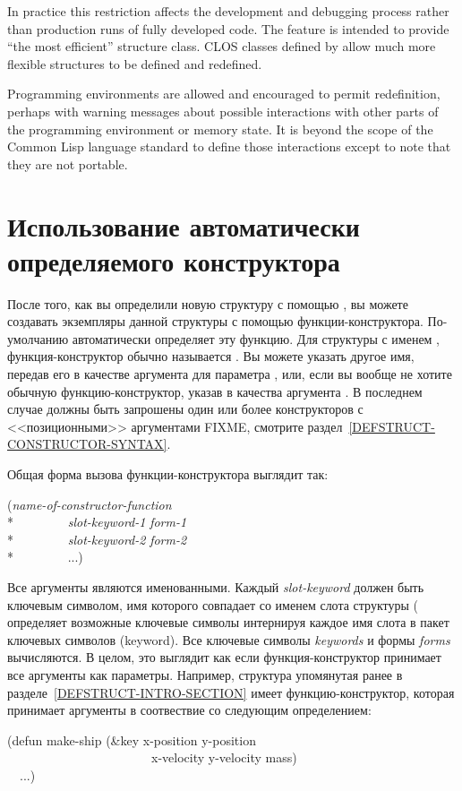 \begin{defmac}
\begin{newer}
In practice this restriction affects the development
and debugging process rather than production runs of fully developed code.
The  feature is intended to provide
``the most efficient'' structure class.
CLOS classes defined by 
allow much more flexible structures to be defined and redefined.

Programming environments are allowed and encouraged to permit 
redefinition, perhaps with warning messages about possible interactions
with other parts of the programming environment or memory state.
It is beyond the scope of the Common Lisp
language standard to define those interactions except to note that they
are not portable.
\end{newer}
\end{defmac}

\section{Использование автоматически определяемого конструктора}

После того, как вы определили новую структуру с помощью , вы
можете создавать экземпляры данной структуры с помощью функции-конструктора.
По-умолчанию  автоматически определяет эту функцию.
Для структуры с именем , функция-конструктор обычно называется
.
Вы можете указать другое имя, передав его в качестве аргумента для параметра
, или, если вы вообще не хотите обычную функцию-конструктор, указав в качества аргумента {\false}. 
В последнем случае должны быть запрошены один или более конструкторов
с <<позиционными>> аргументами FIXME, смотрите раздел~\ref{DEFSTRUCT-CONSTRUCTOR-SYNTAX}.

Общая форма вызова функции-конструктора выглядит так:
\begin{lisp}
(\emph{name-of-constructor-function} \\*
~~~~~~~~\emph{slot-keyword-1} \emph{form-1} \\*
~~~~~~~~\emph{slot-keyword-2} \emph{form-2} \\*
~~~~~~~~...)
\end{lisp}
Все аргументы являются именованными. Каждый \emph{slot-keyword} должен быть
ключевым символом, имя которого совпадает со именем слота структуры
( определяет возможные ключевые символы интернируя каждое имя
слота в пакет ключевых символов (keyword). Все ключевые символы \emph{keywords}
и формы \emph{forms} вычисляются. В целом, это выглядит как если функция-конструктор принимает все аргументы как  параметры. Например,
структура  упомянутая ранее в разделе~\ref{DEFSTRUCT-INTRO-SECTION}
имеет функцию-конструктор, которая принимает аргументы в соотвествие со
следующим определением:
\begin{lisp}
(defun make-ship (\&key x-position y-position \\
~~~~~~~~~~~~~~~~~~~~~~~x-velocity y-velocity mass) \\
~~...)
\end{lisp}

